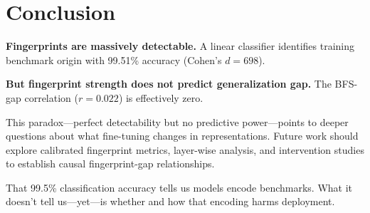 \section{Conclusion}
\label{sec:conclusion}

\textbf{Fingerprints are massively detectable.} A linear classifier identifies training benchmark origin with 99.51\% accuracy (Cohen's $d = 698$).

\textbf{But fingerprint strength does not predict generalization gap.} The BFS-gap correlation ($r = 0.022$) is effectively zero.

This paradox---perfect detectability but no predictive power---points to deeper questions about what fine-tuning changes in representations. Future work should explore calibrated fingerprint metrics, layer-wise analysis, and intervention studies to establish causal fingerprint-gap relationships.

That 99.5\% classification accuracy tells us models encode benchmarks. What it doesn't tell us---yet---is whether and how that encoding harms deployment.

